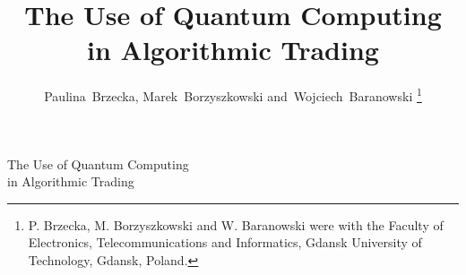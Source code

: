 


%
\title{The Use of Quantum Computing\\ in Algorithmic Trading}
%
%
%
\author{Paulina~Brzecka,
        Marek~Borzyszkowski
        and~Wojciech~Baranowski%
\thanks{P. Brzecka, M. Borzyszkowski and W. Baranowski were with the Faculty 
of Electronics, Telecommunications and Informatics, Gdansk University of Technology, Gdansk,
Poland.}%
}
% 
%



%
{The Use of Quantum Computing\\ in Algorithmic Trading}
% 





